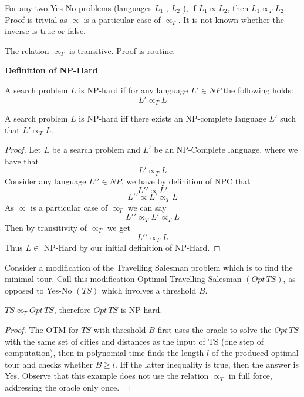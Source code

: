 \begin{theorem}
    For any two Yes-No problems (languages $L_1$ , $L_2$ ),
    if $L_1 \propto L_2$,
    then $L_1 \propto_T L_2$.
    Proof is trivial as $\propto$ is a particular case of $\propto_T$.
    It is not known whether the inverse is true or false.
\end{theorem}

\begin{theorem}
    The relation $\propto_T$ is transitive.
    Proof is routine.
\end{theorem}

\textbf{Definition of NP-Hard}
\begin{definition}
    A search problem $L$ is NP-hard if for any language
    $L\prime \in NP$ the following holds:
    $$L\prime \propto_T L$$
\end{definition}
\begin{theorem}
    A search problem $L$ is NP-hard iff
    there exists an NP-complete language $L\prime$ such that
    $L\prime \propto_T L$.
\end{theorem}
\begin{proof}
    Let $L$ be a search problem and $L\prime$ be an NP-Complete language,
    where we have that
    $$L\prime \propto_T L$$
    Consider any language $L\prime\prime \in NP$,
    we have by definition of NPC that
    $$L\prime\prime \propto L\prime$$
    $$L\prime\prime \propto L\prime \propto_T L$$
    As $\propto$ is a particular case of $\propto_T$ we can say
    $$L\prime\prime \propto_T L\prime \propto_T L$$
    Then by transitivity of $\propto_T$ we get
    $$L\prime\prime \propto_T L$$
    Thus $L \in$ NP-Hard by our initial definition of NP-Hard.
\end{proof}

Consider a modification of the Travelling Salesman problem
which is to find the minimal tour.
Call this modification Optimal Travelling Salesman $(Opt\,TS)$,
as opposed to Yes-No $(TS)$ which involves a threshold $B$.

\begin{theorem}
    $TS \propto_T Opt\,TS$, therefore $Opt\,TS$ is NP-hard.
\end{theorem}

\begin{proof}
    The OTM for $TS$ with threshold $B$ first uses the oracle
    to solve the $Opt\,TS$ with the same set of cities and distances as the input of TS
    (one step of computation),
    then in polynomial time finds the length $l$ of the produced optimal tour
    and checks whether $B \geq l$.
    Iff the latter inequality is true, then the answer is Yes.
    Observe that this example does not use the relation $\propto_T$ in full force, addressing the oracle only once.
\end{proof}
